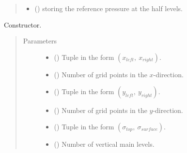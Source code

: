 \documentclass[letterpaper,10pt,english]{sphinxmanual}
\begin{document}
\begin{fulllineitems}
\begin{quote}
\begin{description}
\begin{itemize}
\item {} 
 () \textendash{}  storing the reference pressure at the half levels.

\end{itemize}

\end{description}\end{quote}

\begin{fulllineitems}
\label{\detokenize{api:tasmania.grids.sigma.Sigma3d.__init__}}
Constructor.
\begin{quote}\begin{description}
\item[{Parameters}] \leavevmode\begin{itemize}
\item {} 
 () \textendash{} Tuple in the form \((x_{left}, ~ x_{right})\).

\item {} 
 () \textendash{} Number of grid points in the \(x\)-direction.

\item {} 
 () \textendash{} Tuple in the form \((y_{left}, ~ y_{right})\).

\item {} 
 () \textendash{} Number of grid points in the \(y\)-direction.

\item {} 
 () \textendash{} Tuple in the form \((\sigma_{top}, ~ \sigma_{surface})\).

\item {} 
 () \textendash{} Number of vertical main levels.


\end{itemize}
\end{description}
\end{quote}
\end{fulllineitems}
\end{fulllineitems}
\end{document}
